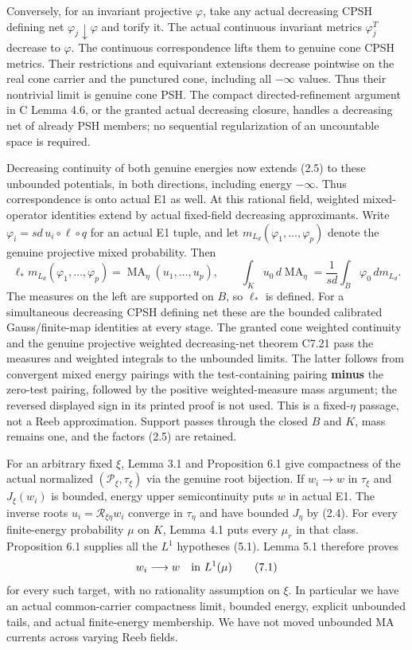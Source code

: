 \documentclass[
  10pt,
]{article}
\begin{document}
Conversely, for an invariant projective \(\varphi\), take any actual
decreasing CPSH defining net \(\varphi_j\downarrow\varphi\) and torify
it. The actual continuous invariant metrics \(\varphi_j^T\) decrease to
\(\varphi\). The continuous correspondence lifts them to genuine cone
CPSH metrics. Their restrictions and equivariant extensions decrease
pointwise on the real cone carrier and the punctured cone, including all
\(-\infty\) values. Thus their nontrivial limit is genuine cone PSH. The
compact directed-refinement argument in C Lemma 4.6, or the granted
actual decreasing closure, handles a decreasing net of already PSH
members; no sequential regularization of an uncountable space is
required.

Decreasing continuity of both genuine energies now extends (2.5) to
these unbounded potentials, in both directions, including energy
\(-\infty\). Thus correspondence is onto actual E1 as well. At this
rational field, weighted mixed-operator identities extend by actual
fixed-field decreasing approximants. Write
\(\varphi_i=sd\,u_i\circ\ell\circ q\) for an actual E1 tuple, and let
\(m_{L_d}(\varphi_1,\ldots,\varphi_p)\) denote the genuine projective
mixed probability. Then \[
\ell_*m_{L_d}(\varphi_1,\ldots,\varphi_p)
       =\operatorname{MA}_\eta(u_1,\ldots,u_p),\qquad
\int_Ku_0\,d\operatorname{MA}_\eta
       =\frac1{sd}\int_B\varphi_0\,dm_{L_d}.                    \tag{7.0}
\] The measures on the left are supported on \(B\), so \(\ell_*\) is
defined. For a simultaneous decreasing CPSH defining net these are the
bounded calibrated Gauss/finite-map identities at every stage. The
granted cone weighted continuity and the genuine projective weighted
decreasing-net theorem C7.21 pass the measures and weighted integrals to
the unbounded limits. The latter follows from convergent mixed energy
pairings with the test-containing pairing \textbf{minus} the zero-test
pairing, followed by the positive weighted-measure mass argument; the
reversed displayed sign in its printed proof is not used. This is a
fixed-\(\eta\) passage, not a Reeb approximation. Support passes through
the closed \(B\) and \(K\), mass remains one, and the factors (2.5) are
retained.

For an arbitrary fixed \(\xi\), Lemma 3.1 and Proposition 6.1 give
compactness of the actual normalized \((\mathcal P_\xi,\tau_\xi)\) via
the genuine root bijection. If \(w_i\to w\) in \(\tau_\xi\) and
\(J_\xi(w_i)\) is bounded, energy upper semicontinuity puts \(w\) in
actual E1. The inverse roots \(u_i=\mathcal R_{\xi\eta}w_i\) converge in
\(\tau_\eta\) and have bounded \(J_\eta\) by (2.4). For every
finite-energy probability \(\mu\) on \(K\), Lemma 4.1 puts every
\(\mu_r\) in that class. Proposition 6.1 supplies all the \(L^1\)
hypotheses (5.1). Lemma 5.1 therefore proves \[
w_i\longrightarrow w\quad\hbox{in }L^1(\mu)                          \tag{7.1}
\] for every such target, with no rationality assumption on \(\xi\). In
particular we have an actual common-carrier compactness limit, bounded
energy, explicit unbounded tails, and actual finite-energy membership.
We have not moved unbounded MA currents across varying Reeb fields.
\end{document}
